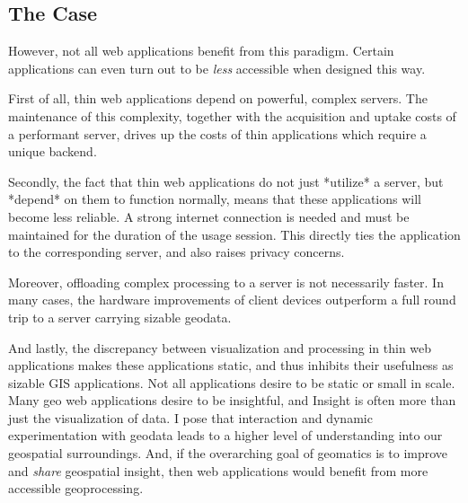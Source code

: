 \subsection*{The Case}

However, not all web applications benefit from this paradigm. Certain applications can even turn out to be \emph{less} accessible when designed this way. 


First of all, thin web applications depend on powerful, complex servers. The maintenance of this complexity, together with the acquisition and uptake costs of a performant server, drives up the costs of thin applications which require a unique backend. 


Secondly, the fact that thin web applications do not just *utilize* a server, but *depend* on them to function normally, means that these applications will become less reliable. A strong internet connection is needed and must be maintained for the duration of the usage session. This directly ties the application to the corresponding server, and also raises privacy concerns. 


Moreover, offloading complex processing to a server is not necessarily faster. In many cases, the hardware improvements of client devices outperform a full round trip to a server carrying sizable geodata. 


And lastly, the discrepancy between visualization and processing in thin web applications makes these applications static, and thus inhibits their usefulness as sizable GIS applications. 
Not all applications desire to be static or small in scale. 
Many geo web applications desire to be insightful, and Insight is often more than just the visualization of data. 
I pose that interaction and dynamic experimentation with geodata leads to a higher level of understanding into our geospatial surroundings. 
And, if the overarching goal of geomatics is to improve and \emph{share} geospatial insight, then web applications would benefit from more accessible geoprocessing.

